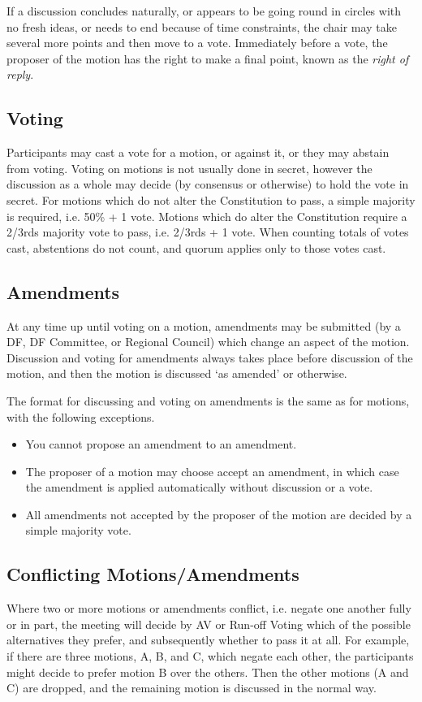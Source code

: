 \documentclass[a4paper, 11pt]{article} %
\begin{document}
If a discussion concludes naturally, or appears to be going round in circles with no fresh ideas, or needs to end because of time constraints, the chair may take several more points and then move to a vote.  Immediately before a vote, the proposer of the motion has the right to make a final point, known as the \emph{right of reply}.

\subsection{Voting}
\label{sec:motionvoting}
Participants may cast a vote for a motion, or against it, or they may abstain from voting.  Voting on motions is not usually done in secret, however the discussion as a whole may decide (by consensus or otherwise) to hold the vote in secret.  For motions which do not alter the Constitution to pass, a simple majority is required, i.e. 50\% + 1 vote.  Motions which do alter the Constitution require a 2/3rds majority vote to pass, i.e. 2/3rds + 1 vote.  When counting totals of votes cast, abstentions do not count, and quorum applies only to those votes cast.

\subsection{Amendments}
At any time up until voting on a motion, amendments may be submitted (by a DF, DF Committee, or Regional Council) which change an aspect of the motion.  Discussion and voting for amendments always takes place before discussion of the motion, and then the motion is discussed `as amended' or otherwise.

The format for discussing and voting on amendments is the same as for motions, with the following exceptions.
\begin{itemize}
\item You cannot propose an amendment to an amendment.
\item The proposer of a motion may choose accept an amendment, in which case the amendment is applied automatically without discussion or a vote.
\item All amendments not accepted by the proposer of the motion are decided by a simple majority vote.
\end{itemize}

\subsection{Conflicting Motions/Amendments}
\label{sec:conflicting}
Where two or more motions or amendments conflict, i.e. negate one another fully or in part, the meeting will decide by AV or Run-off Voting which of the possible alternatives they prefer, and subsequently whether to pass it at all.  For example, if there are three motions, A, B, and C, which negate each other, the participants might decide to prefer motion B over the others.  Then the other motions (A and C) are dropped, and the remaining motion is discussed in the normal way.
\end{document}

